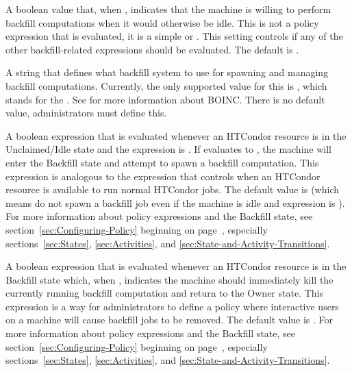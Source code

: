 \begin{description}

\label{param:EnableBackfill}
\item[\Macro{ENABLE\_BACKFILL}]
  A boolean value that, when , indicates that the machine is willing
  to perform backfill computations when it would otherwise be idle.
  This is not a policy expression that is evaluated, it is a simple
   or .
  This setting controls if any of the other backfill-related
  expressions should be evaluated.
  The default is .

\label{param:BackfillSystem}
\item[\Macro{BACKFILL\_SYSTEM}]
  A string that defines what backfill system to use for spawning and managing
  backfill computations.
  Currently, the only supported value for this is , which
  stands for the .
  See  for more information about
  BOINC.
  There is no default value, administrators must define this.
  
\label{param:StartBackfill}
\item[\Macro{START\_BACKFILL}]
  A boolean expression that is evaluated whenever an HTCondor resource is in the
  Unclaimed/Idle state and the  expression
  is .  
  If  evaluates to , the machine
  will enter the Backfill state and attempt to spawn a backfill
  computation. 
  This expression is analogous to the  expression that
  controls when an HTCondor resource is available to run normal HTCondor
  jobs.
  The default value is  (which means do not spawn a
  backfill job even if the machine is idle and
   expression is ).
  For more information about policy expressions and the Backfill
  state, see section~\ref{sec:Configuring-Policy} beginning on
  page~\pageref{sec:Configuring-Policy}, especially
  sections~\ref{sec:States}, \ref{sec:Activities}, and
  \ref{sec:State-and-Activity-Transitions}.

\label{param:EvictBackfill}
\item[\Macro{EVICT\_BACKFILL}]
  A boolean expression that is evaluated whenever an HTCondor resource is in the
  Backfill state which, when , indicates the machine should
  immediately kill the currently running backfill computation and
  return to the Owner state.
  This expression is a way for administrators to define a policy where
  interactive users on a machine will cause backfill jobs to be
  removed.
  The default value is .
  For more information about policy expressions and the Backfill
  state, see section~\ref{sec:Configuring-Policy} beginning on
  page~\pageref{sec:Configuring-Policy}, especially
  sections~\ref{sec:States}, \ref{sec:Activities}, and
  \ref{sec:State-and-Activity-Transitions}.

\end{description}


